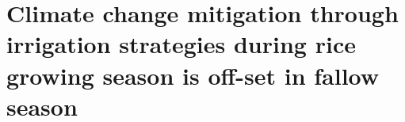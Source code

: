 %
%
\def\Plus{\texttt{+}} %
%

%
%

\chapter{Climate change mitigation through irrigation strategies during rice growing season is off-set in fallow season}
\label{Chapter2}

